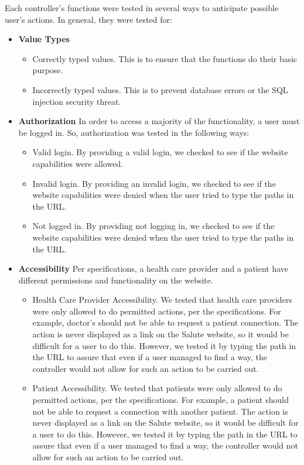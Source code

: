 Each controller's functions were tested in several ways to anticipate possible user's actions. In general, they were tested for:
\begin{itemize}
\item \textbf{Value Types}
\begin{itemize}
\item Correctly typed values. This is to ensure that the functions do their basic purpose.
\item Incorrectly typed values. This is to prevent database errors or the SQL injection security threat.
\end{itemize}
\item \textbf{Authorization} In order to access a majority of the functionality, a user must be logged in. So, authorization was tested in the following ways: 
\begin{itemize}
\item  Valid login. By providing a valid login, we checked to see if the website capabilities were allowed. 
\item Invalid login. By providing an invalid login, we checked to see if the website capabilities were denied when the user tried to type the paths in the URL.
\item Not logged in. By providing not logging in, we checked to see if the website capabilities were denied when the user tried to type the paths in the URL.
\end{itemize}
\item\textbf{Accessibility} Per specifications, a health care provider and a patient have different permissions and functionality on the website. 
\begin{itemize}
\item Health Care Provider Accessibility. We tested that health care providers were only allowed to do permitted actions, per the specifications. For example, doctor's should not be able to request a patient connection. The action is never displayed as a link on the Salute website, so it would be difficult for a user to do this. However, we tested it by typing the path in the URL to assure that even if a user managed to find a way, the controller would not allow for such an action to be carried out. 
\item Patient Accessibility. We tested that patients were only allowed to do permitted actions, per the specifications. For example, a patient should not be able to request a connection with another patient. The action is never displayed as a link on the Salute website, so it would be difficult for a user to do this. However, we tested it by typing the path in the URL to assure that even if a user managed to find a way, the controller would not allow for such an action to be carried out. 

\end{itemize}
\end{itemize}
